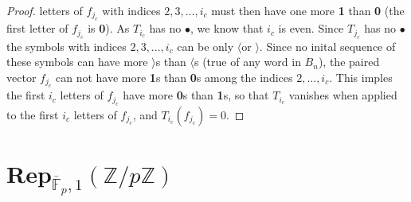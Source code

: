 \documentclass[11pt]{article} %
\newcommand{\lcap}{\boldmath$\langle$\unboldmath}
\newcommand{\rcap}{\boldmath$\rangle$\unboldmath}
\newcommand{\dotmap}{$\bullet$}
\begin{document}
\begin{proof}
letters of $f_{j_c}$ with indices $2,3,...,i_c$ must then have one more \textbf{1} than \textbf{0} (the first letter of $f_{j_c}$ is \textbf{0}). As $T_{i_c}$ has no \dotmap, we know that $i_c$ is even. Since $T_{j_c}$ has no \dotmap\hspace{1mm}the symbols with indices $2,3,...,i_c$ can be only \lcap\hspace{1mm}or \rcap\hspace{1mm}. Since no inital sequence of these symbols can have more \rcap s than \lcap s (true of any word in $B_n$), the paired vector $f_{j_c}$ can not have more \textbf{1}s than \textbf{0}s among the indices $2,...,i_c$. This imples the first $i_c$ letters of $f_{j_c}$ have more \textbf{0}s than \textbf{1}s, so that $T_{i_c}$ vanishes when applied to the first $i_c$ letters of $f_{j_c}$, and $T_{i_c}(f_{j_c})=0$.







\end{proof}


\section{Rep$_{\overline{\mathbb{F}}_p,1}(\mathbb{Z}/p\mathbb{Z})$}
\newcommand{\fpbar}{\overline{\mathbb{F}}_p}
\end{document}
